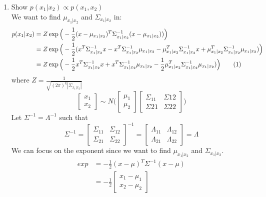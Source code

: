 \documentclass{article}
\newcommand\numberthis{\addtocounter{equation}{1}\tag{\theequation}}
\begin{document}
\begin{enumerate}[label=(\alph*)]
\item Show $p(x_1|x_2)\propto{}p(x_1,x_2)$ \\
We want to find $\mu_{x_1|x_2}$ and $\Sigma_{x_1|x_2}$ in:
\begin{align*}
p(x_1|x_2)&=Z\exp\Big(-\frac{1}{2}(x-\mu_{x_1|x_2})^T\Sigma_{x_1|x_2}^{-1}(x-\mu_{x_1|x_2}))\Big) \\
&=Z\exp\Big(-\frac{1}{2}(x^T\Sigma_{x_1|x_2}^{-1}x-x^T\Sigma_{x_1|x_2}^{-1}\mu_{x_1|x_2}
-\mu_{x_1|x_2}^T\Sigma_{x_1|x_2}^{-1}x+\mu_{x_1|x_2}^T\Sigma_{x_1|x_2}^{-1}\mu_{x_1|x_2})\Big) \\
&=Z\exp\Big(-\frac{1}{2}x^T\Sigma_{x_1|x_2}^{-1}x+x^T\Sigma_{x_1|x_2}^{-1}\mu_{x_1|x_2}
-\frac{1}{2}\mu_{x_1|x_2}^T\Sigma_{x_1|x_2}^{-1}\mu_{x_1|x_2})\Big) \numberthis \label{e1}
\end{align*}
where $Z=\frac{1}{\sqrt{(2\pi)^k|\Sigma_{x_1|x_2}|}}$
\[
\begin{bmatrix}
  x_1 \\ x_2
\end{bmatrix}
\sim{}N \Bigg(
\begin{bmatrix}
  \mu_1 \\ \mu_2
\end{bmatrix}
\begin{bmatrix}
  \Sigma_{11} & \Sigma{12} \\ \Sigma{21} & \Sigma{22}
\end{bmatrix}
\Bigg)
\]
Let $\Sigma^{-1}=\Lambda^{-1}$ such that
\[
\Sigma^{-1}=
\begin{bmatrix}
  \Sigma_{11} & \Sigma_{12} \\ \Sigma_{21} & \Sigma_{22}
\end{bmatrix}
^{-1}=
\begin{bmatrix}
  \Lambda_{11} & \Lambda_{12} \\ \Lambda_{21} & \Lambda_{22}
\end{bmatrix}
=\Lambda
\]
We can focus on the exponent since we want to find $\mu_{x_1|x_2}$ and $\Sigma_{x_1|x_2}$.
\begin{align*}
exp&=-\frac{1}{2}(x-\mu)^T\Sigma^{-1}(x-\mu) \\
&=-\frac{1}{2}
\begin{bmatrix}
  x_1 - \mu_1 \\ x_2 - \mu_2

\end{bmatrix}
\end{align*}
\end{enumerate}
\end{document}
